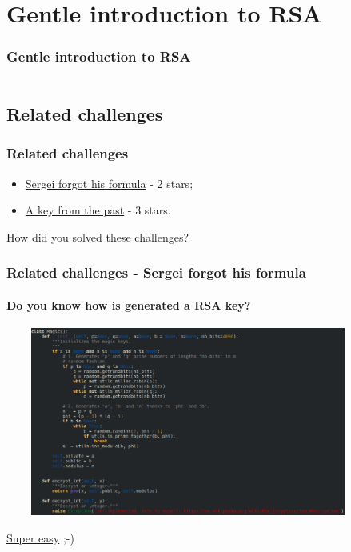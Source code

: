 \documentclass[]{beamer}
\begin{document}
 

 
 

 
%
%
\section{Gentle introduction to RSA}
\begin{frame}
    \frametitle{Gentle introduction to RSA}
    \begin{columns}[t]
        \begin{column}{5cm}
            \tableofcontents[sections={1-3}, currentsection, hideothersubsections]
        \end{column}
        \begin{column}{5cm}
            \tableofcontents[sections={4-5}, currentsection, hideothersubsections]
        \end{column}
    \end{columns}
\end{frame}

\subsection{Related challenges}
\begin{frame}
\frametitle{Related challenges}
\begin{itemize}
    \item \href{https://github.com/cscluxembourg/vestatech/blob/master/challenges/Sergei_forgot_his_formula/wip.py}{Sergei forgot his formula} - 2 stars;
    \item \href{https://github.com/cscluxembourg/vestatech/tree/master/challenges/A_key_from_the_past}{A key from the past} - 3 stars.
\end{itemize}
\bigskip
How did you solved these challenges?
\end{frame}

\begin{frame}
\frametitle{Related challenges - Sergei forgot his formula}
\framesubtitle{Do you know how is generated a RSA key?}
\begin{center}
    \includegraphics[height=6.2cm, width=12.0cm]{./images/RSA-algo-key-generation.png}
\end{center}
\href{https://en.wikipedia.org/wiki/RSA_(cryptosystem)\#Decryption}{Super easy} ;-)
\end{frame}
\end{document}
